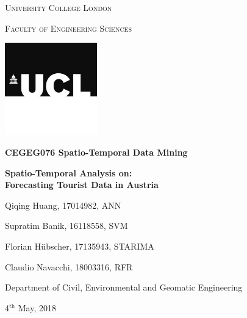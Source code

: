 \documentclass[a4paper,reqno,]{article}
\begin{document}
\begin{titlepage}
\centering
{\scshape University College London \par}
{\scshape Faculty of Engineering Sciences \par}
\vspace{1cm}
\begin{minipage}[b]{1\textwidth}
\centering
    \includegraphics[width=0.3\textwidth]{images/ucl_logo.jpg}
\end{minipage}
\newline
\newline
\newline
{\large\bfseries CEGEG076 Spatio-Temporal Data Mining \par}
\vspace{1.5cm}
{\huge\bfseries  Spatio-Temporal Analysis on: \\
 Forecasting Tourist Data in Austria\par}
\vspace{3cm}
{\large Qiqing Huang, 17014982, ANN \par}
\vspace{0.25cm}
{\large Supratim Banik, 16118558, SVM \par}
\vspace{0.25cm}
{\large Florian Hübscher, 17135943, STARIMA \par}
\vspace{0.25cm}
{\large Claudio Navacchi, 18003316, RFR \par}
\vspace{3cm}
{Department of Civil, Environmental and Geomatic Engineering \par}
{4$^{\text{th}}$ May, 2018 \par}
\end{titlepage}
\tableofcontents
\newpage
\pagestyle{fancy}
\fancyhf{}
\setlength{\headheight}{25pt}
\headsep=30pt
\rfoot{\thepage}
\renewcommand{\headrulewidth}{0.4pt}
\end{document}
